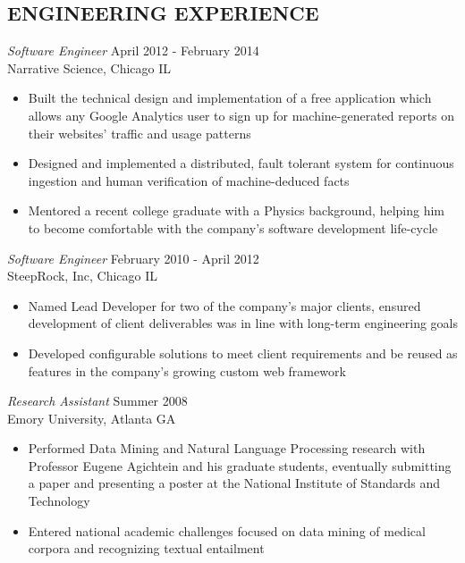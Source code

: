 \documentclass[line,margin]{res}
\begin{document}
\begin{resume}
\section{ENGINEERING EXPERIENCE}
        {\sl Software Engineer} \hfill April 2012 - February 2014 \\
        Narrative Science, Chicago IL
        \begin{itemize} 
          \item Built the technical design and implementation of a
            free application which allows any Google Analytics user to
            sign up for machine-generated reports on their websites'
            traffic and usage patterns
          \item Designed and implemented a distributed, fault tolerant
            system for continuous ingestion and human verification of
            machine-deduced facts
          \item Mentored a recent college graduate with a Physics
            background, helping him to become comfortable with
            the company's software development life-cycle
        \end{itemize}

        {\sl Software Engineer} \hfill February 2010 - April 2012 \\
        SteepRock, Inc, Chicago IL
        \begin{itemize}
        \item Named Lead Developer for two of the company's major
          clients, ensured development of client
          deliverables was in line with long-term engineering goals
        \item Developed configurable solutions to meet client
          requirements and be reused as features in the company's
          growing custom web framework
        \end{itemize}

        {\sl Research Assistant} \hfill Summer 2008 \\
        Emory University, Atlanta GA
        \begin{itemize}
        \item Performed Data Mining and Natural Language Processing research
          with Professor Eugene Agichtein and his graduate students,
          eventually submitting a paper and presenting a poster at the National
          Institute of Standards and Technology
        \item Entered national academic challenges focused on data
          mining of medical corpora and recognizing textual entailment
        \end{itemize}


\end{resume}
\end{document}
